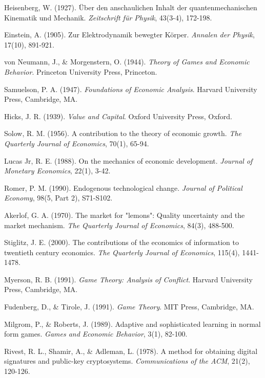 \documentclass[12pt,a4paper]{article}
\begin{document}
\begin{thebibliography}{99}
 Heisenberg, W. (1927). Über den anschaulichen Inhalt der quantenmechanischen Kinematik und Mechanik. \textit{Zeitschrift für Physik}, 43(3-4), 172-198.

 Einstein, A. (1905). Zur Elektrodynamik bewegter Körper. \textit{Annalen der Physik}, 17(10), 891-921.

 von Neumann, J., \& Morgenstern, O. (1944). \textit{Theory of Games and Economic Behavior}. Princeton University Press, Princeton.

 Samuelson, P. A. (1947). \textit{Foundations of Economic Analysis}. Harvard University Press, Cambridge, MA.

 Hicks, J. R. (1939). \textit{Value and Capital}. Oxford University Press, Oxford.

 Solow, R. M. (1956). A contribution to the theory of economic growth. \textit{The Quarterly Journal of Economics}, 70(1), 65-94.

 Lucas Jr, R. E. (1988). On the mechanics of economic development. \textit{Journal of Monetary Economics}, 22(1), 3-42.

 Romer, P. M. (1990). Endogenous technological change. \textit{Journal of Political Economy}, 98(5, Part 2), S71-S102.

 Akerlof, G. A. (1970). The market for "lemons": Quality uncertainty and the market mechanism. \textit{The Quarterly Journal of Economics}, 84(3), 488-500.

 Stiglitz, J. E. (2000). The contributions of the economics of information to twentieth century economics. \textit{The Quarterly Journal of Economics}, 115(4), 1441-1478.

 Myerson, R. B. (1991). \textit{Game Theory: Analysis of Conflict}. Harvard University Press, Cambridge, MA.

 Fudenberg, D., \& Tirole, J. (1991). \textit{Game Theory}. MIT Press, Cambridge, MA.

 Milgrom, P., \& Roberts, J. (1989). Adaptive and sophisticated learning in normal form games. \textit{Games and Economic Behavior}, 3(1), 82-100.

 Rivest, R. L., Shamir, A., \& Adleman, L. (1978). A method for obtaining digital signatures and public-key cryptosystems. \textit{Communications of the ACM}, 21(2), 120-126.


\end{thebibliography}
\end{document}
